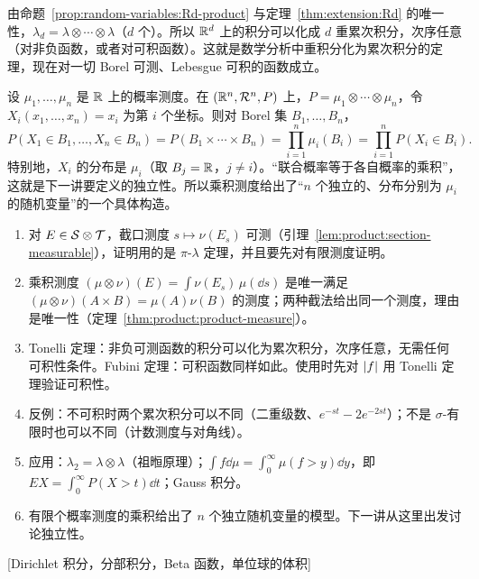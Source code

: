 \begin{example}[$d$ 维 Lebesgue 测度]
由命题~\ref{prop:random-variables:Rd-product} 与定理~\ref{thm:extension:Rd} 的唯一性，$\lambda_d=\lambda\otimes\cdots\otimes\lambda$（$d$ 个）。所以 $\mathbb{R}^d$ 上的积分可以化成 $d$ 重累次积分，次序任意（对非负函数，或者对可积函数）。这就是数学分析中重积分化为累次积分的定理，现在对一切 Borel 可测、Lebesgue 可积的函数成立。
\end{example}

\begin{example}[$n$ 次独立试验的模型]\label{ex:product:independent-trials}
设 $\mu_1,\dots,\mu_n$ 是 $\mathbb{R}$ 上的概率测度。在 $(\mathbb{R}^n,\mathcal{R}^n,P)$ 上，$P=\mu_1\otimes\cdots\otimes\mu_n$，令 $X_i(x_1,\dots,x_n)=x_i$ 为第 $i$ 个坐标。则对 Borel 集 $B_1,\dots,B_n$，
\[
P(X_1\in B_1,\dots,X_n\in B_n)=P(B_1\times\cdots\times B_n)=\prod_{i=1}^n\mu_i(B_i)=\prod_{i=1}^nP(X_i\in B_i).
\]
特别地，$X_i$ 的分布是 $\mu_i$（取 $B_j=\mathbb{R}$，$j\neq i$）。“联合概率等于各自概率的乘积”，这就是下一讲要定义的独立性。所以乘积测度给出了“$n$ 个独立的、分布分别为 $\mu_i$ 的随机变量”的一个具体构造。
\end{example}


\begin{enumerate}
\item 对 $E\in\mathcal{S}\otimes\mathcal{T}$，截口测度 $s\mapsto\nu(E_s)$ 可测（引理~\ref{lem:product:section-measurable}），证明用的是 $\pi$-$\lambda$ 定理，并且要先对有限测度证明。
\item 乘积测度 $(\mu\otimes\nu)(E)=\int\nu(E_s)\,\mu(\dd s)$ 是唯一满足 $(\mu\otimes\nu)(A\times B)=\mu(A)\nu(B)$ 的测度；两种截法给出同一个测度，理由是唯一性（定理~\ref{thm:product:product-measure}）。
\item Tonelli 定理：非负可测函数的积分可以化为累次积分，次序任意，无需任何可积性条件。Fubini 定理：可积函数同样如此。使用时先对 $\lvert f\rvert$ 用 Tonelli 定理验证可积性。
\item 反例：不可积时两个累次积分可以不同（二重级数、$e^{-st}-2e^{-2st}$）；不是 $\sigma$-有限时也可以不同（计数测度与对角线）。
\item 应用：$\lambda_2=\lambda\otimes\lambda$（祖暅原理）；$\int f\dd\mu=\int_0^\infty\mu(f>y)\dd y$，即 $EX=\int_0^\infty P(X>t)\dd t$；Gauss 积分。
\item 有限个概率测度的乘积给出了 $n$ 个独立随机变量的模型。下一讲从这里出发讨论独立性。
\end{enumerate}

[Dirichlet 积分，分部积分，Beta 函数，单位球的体积]
\label{hw:product-measures}

